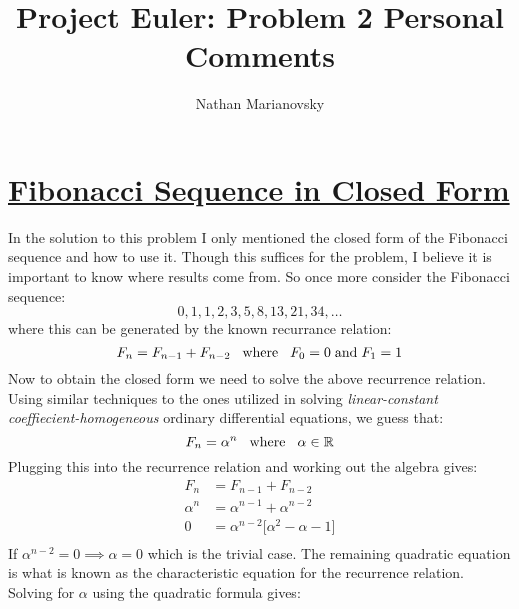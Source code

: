 \documentclass[12pt, letterpaper, onecolumn, conference, final]{IEEEtran}
\title{Project Euler: Problem 2 Personal Comments}
\author{Nathan Marianovsky}
\theoremstyle{definition}
\theoremstyle{plain}
\begin{document}
\maketitle

\section*{\underline{\Large{Fibonacci Sequence in Closed Form}}}
\vspace{.3cm}
\noindent
In the solution to this problem I only mentioned the closed form of the Fibonacci sequence and how to use it. Though this suffices for the problem, I believe it is important to know where results come from. So once more consider the Fibonacci sequence:
\begin{equation*}
0, 1, 1, 2, 3, 5, 8, 13, 21, 34, \dots
\end{equation*}
where this can be generated by the known recurrance relation:
\begin{equation*}
F_n = F_{n-1} + F_{n-2} \hspace{.3cm} \text{where} \hspace{.3cm} F_0 = 0 \hspace{.1cm} \text{and} \hspace{.1cm} F_1 = 1
\end{equation*}
Now to obtain the closed form we need to solve the above recurrence relation. Using similar techniques to the ones utilized in solving \textit{linear-constant coeffiecient-homogeneous} ordinary differential equations, we guess that:
\begin{equation*}
F_n = \alpha^n \hspace{.3cm} \text{where} \hspace{.3cm} \alpha \in \mathbb{R}
\end{equation*}
Plugging this into the recurrence relation and working out the algebra gives:
\begin{equation*}
\begin{split}
F_n &= F_{n-1} + F_{n-2} \\
\alpha^n &= \alpha^{n-1} + \alpha^{n-2} \\
0 &= \alpha^{n-2} \Big[ \alpha^2 - \alpha - 1 \Big] \\
\end{split}
\end{equation*}
If $\alpha^{n-2} = 0 \implies \alpha = 0$ which is the trivial case. The remaining quadratic equation is what is known as the characteristic equation for the recurrence relation. Solving for $\alpha$ using the quadratic formula gives:
\end{document}
